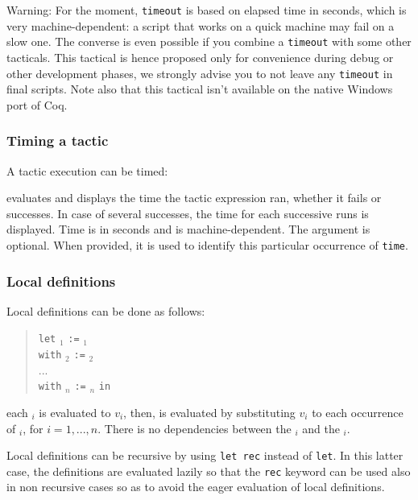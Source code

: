 Warning: For the moment, {\tt timeout} is based on elapsed time in
seconds, which is very
machine-dependent: a script that works on a quick machine may fail
on a slow one. The converse is even possible if you combine a
{\tt timeout} with some other tacticals. This tactical is hence
proposed only for convenience during debug or other development
phases, we strongly advise you to not leave any {\tt timeout} in
final scripts. Note also that this tactical isn't available on
the native Windows port of Coq.

\subsubsection{Timing a tactic
}

A tactic execution can be timed:
\begin{quote}
{}
\end{quote}
evaluates {\tacexpr}
and displays the time the tactic expression ran, whether it fails or
successes. In case of several successes, the time for each successive
runs is displayed. Time is in seconds and is machine-dependent. The
{\qstring} argument is optional. When provided, it is used to identify
this particular occurrence of {\tt time}.

\subsubsection[Local definitions]{Local definitions
}

Local definitions can be done as follows:
\begin{quote}
{\tt let} {\ident}$_1$ {\tt :=} {\tacexpr}$_1$\\
{\tt with} {\ident}$_2$ {\tt :=} {\tacexpr}$_2$\\
...\\
{\tt with} {\ident}$_n$ {\tt :=} {\tacexpr}$_n$ {\tt in}\\
{\tacexpr}
\end{quote}
each {\tacexpr}$_i$ is evaluated to $v_i$, then, {\tacexpr} is
evaluated by substituting $v_i$ to each occurrence of {\ident}$_i$,
for $i=1,...,n$. There is no dependencies between the {\tacexpr}$_i$
and the {\ident}$_i$.

Local definitions can be recursive by using {\tt let rec} instead of
{\tt let}. In this latter case, the definitions are evaluated lazily
so that the {\tt rec} keyword can be used also in non recursive cases
so as to avoid the eager evaluation of local definitions.

